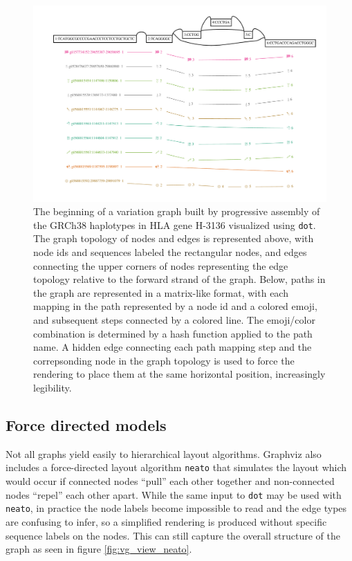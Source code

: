 \begin{figure}[htbp!] 
\centering    
\includegraphics[width=1.0\textwidth]{Chapter2/Figs/vg_view_dp_H-3136_dot.pdf}
\caption[Hierarchical visualization with Graphviz's {\tt dot}]{The beginning of a variation graph built by progressive assembly of the GRCh38 haplotypes in HLA gene H-3136 visualized using {\tt dot}.
  The graph topology of nodes and edges is represented above, with node ids and sequences labeled the rectangular nodes, and edges connecting the upper corners of nodes representing the edge topology relative to the forward strand of the graph.
  Below, paths in the graph are represented in a matrix-like format, with each mapping in the path represented by a node id and a colored emoji, and subsequent steps connected by a colored line.
  The emoji/color combination is determined by a hash function applied to the path name.
  A hidden edge connecting each path mapping step and the correpsonding node in the graph topology is used to force the rendering to place them at the same horizontal position, increasingly legibility.
}
\label{fig:vg_view_dot}
\end{figure}

\subsection{Force directed models}

Not all graphs yield easily to hierarchical layout algorithms.
Graphviz also includes a force-directed layout algorithm {\tt neato} that simulates the layout which would occur if connected nodes ``pull'' each other together and non-connected nodes ``repel'' each other apart.
While the same input to {\tt dot} may be used with {\tt neato}, in practice the node labels become impossible to read and the edge types are confusing to infer, so a simplified rendering is produced without specific sequence labels on the nodes.
This can still capture the overall structure of the graph as seen in figure \ref{fig:vg_view_neato}.

